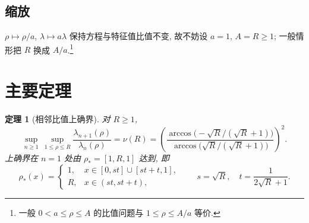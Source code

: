 \documentclass[UTF8]{ctexart}
\newtheorem{theorem}{定理}[section]
\begin{document}
\subsection{缩放}

$\rho \mapsto \rho/a$, $\lambda \mapsto a\lambda$ 保持方程与特征值比值不变,
故不妨设 $a = 1$, $A = R \geq 1$; 一般情形把 $R$ 换成 $A/a$.\footnote{一般 $0 < a \leq \rho \leq A$ 的比值问题与 $1 \leq \rho \leq A/a$ 等价.}

\section{主要定理}

\begin{theorem}[相邻比值上确界]
对 $R \geq 1$,
\begin{equation}
	\boxed{\; \sup_{n \geq 1}\, \sup_{1 \leq \rho \leq R} \frac{\lambda_{n+1}(\rho)}{\lambda_n(\rho)}
	= \nu(R) = \left( \frac{\arccos\!\bigl(-\sqrt{R}/(\sqrt{R}+1)\bigr)}
	{\arccos\!\bigl(\sqrt{R}/(\sqrt{R}+1)\bigr)} \right)^2 . \;}
\end{equation}
上确界在 $n = 1$ 处由 $\rho_* = [1, R, 1]$ 达到, 即
\[
	\rho_*(x) =
	\begin{cases}
		1, & x \in [0, st] \cup [st + t, 1], \\
		R, & x \in (st, st + t),
	\end{cases}
	\qquad s = \sqrt{R}, \quad t = \frac{1}{2\sqrt{R}+1}.
\]
\end{theorem}
\end{document}
